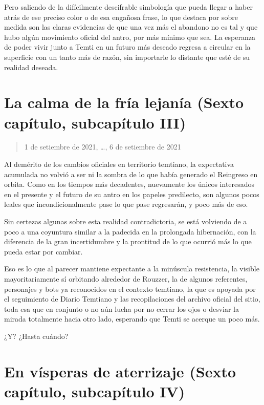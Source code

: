 \documentclass[
  spanish,
]{book}
\begin{document}
Pero saliendo de la difícilmente descifrable simbología que pueda llegar a haber atrás de ese preciso color o de esa engañosa frase, lo que destaca por sobre medida son las claras evidencias de que una vez más el abandono no es tal y que hubo algún movimiento oficial del antro, por más mínimo que sea. La esperanza de poder vivir junto a Temti en un futuro más deseado regresa a circular en la superficie con un tanto más de razón, sin importarle lo distante que esté de su realidad deseada.

\hypertarget{la-calma-de-la-fruxeda-lejanuxeda-sexto-capuxedtulo-subcapuxedtulo-iii}{%
\section{La calma de la fría lejanía (Sexto capítulo, subcapítulo III)}\label{la-calma-de-la-fruxeda-lejanuxeda-sexto-capuxedtulo-subcapuxedtulo-iii}}

\begin{quote}
1 de setiembre de 2021, \ldots, 6 de setiembre de 2021
\end{quote}

Al demérito de los cambios oficiales en territorio temtiano, la expectativa acumulada no volvió a ser ni la sombra de lo que había generado el Reingreso en orbita. Como en los tiempos más decadentes, nuevamente los únicos interesados en el presente y el futuro de su antro en los papeles predilecto, son algunos pocos leales que incondicionalmente pase lo que pase regresarán, y poco más de eso.

Sin certezas algunas sobre esta realidad contradictoria, se está volviendo de a poco a una coyuntura similar a la padecida en la prolongada hibernación, con la diferencia de la gran incertidumbre y la prontitud de lo que ocurrió más lo que pueda estar por cambiar.

Eso es lo que al parecer mantiene expectante a la minúscula resistencia, la visible mayoritariamente sí orbitando alrededor de Rouzzer, la de algunos referentes, personajes y bots ya reconocidos en el contexto temtiano, la que es apoyada por el seguimiento de Diario Temtiano y las recopilaciones del archivo oficial del sitio, toda esa que en conjunto o no aún lucha por no cerrar los ojos o desviar la mirada totalmente hacia otro lado, esperando que Temti se acerque un poco más.

¿Y? ¿Hasta cuándo?

\hypertarget{en-vuxedsperas-de-aterrizaje-sexto-capuxedtulo-subcapuxedtulo-iv}{%
\section{En vísperas de aterrizaje (Sexto capítulo, subcapítulo IV)}\label{en-vuxedsperas-de-aterrizaje-sexto-capuxedtulo-subcapuxedtulo-iv}}
\end{document}

